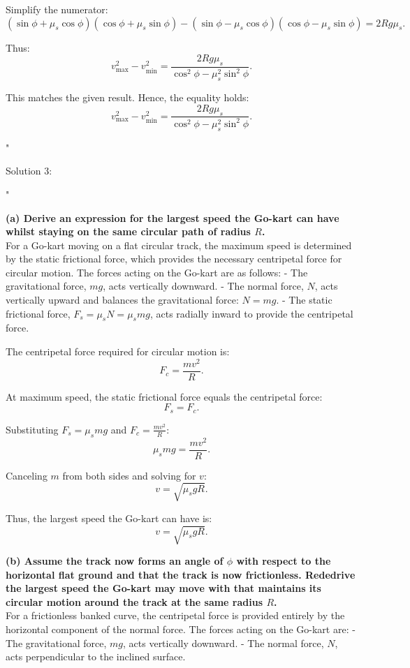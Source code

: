 Simplify the numerator:
\[
(\sin\phi + \mu_s \cos\phi)(\cos\phi + \mu_s \sin\phi) - (\sin\phi - \mu_s \cos\phi)(\cos\phi - \mu_s \sin\phi) = 2Rg\mu_s.
\]

Thus:
\[
v_{\text{max}}^2 - v_{\text{min}}^2 = \frac{2Rg\mu_s}{\cos^2\phi - \mu_s^2 \sin^2\phi}.
\]

This matches the given result. Hence, the equality holds:
\[
\boxed{v_{\text{max}}^2 - v_{\text{min}}^2 = \frac{2Rg\mu_s}{\cos^2\phi - \mu_s^2 \sin^2\phi}}.
\]

"

Solution 3:

"

\textbf{(a) Derive an expression for the largest speed the Go-kart can have whilst staying on the same circular path of radius $R$.} \\

For a Go-kart moving on a flat circular track, the maximum speed is determined by the static frictional force, which provides the necessary centripetal force for circular motion. The forces acting on the Go-kart are as follows:
- The gravitational force, $mg$, acts vertically downward.
- The normal force, $N$, acts vertically upward and balances the gravitational force: $N = mg$.
- The static frictional force, $F_s = \mu_s N = \mu_s mg$, acts radially inward to provide the centripetal force.

The centripetal force required for circular motion is:
\[
F_c = \frac{mv^2}{R}.
\]

At maximum speed, the static frictional force equals the centripetal force:
\[
F_s = F_c.
\]

Substituting $F_s = \mu_s mg$ and $F_c = \frac{mv^2}{R}$:
\[
\mu_s mg = \frac{mv^2}{R}.
\]

Canceling $m$ from both sides and solving for $v$:
\[
v = \sqrt{\mu_s g R}.
\]

Thus, the largest speed the Go-kart can have is:
\[
\boxed{v = \sqrt{\mu_s g R}}.
\]

\textbf{(b) Assume the track now forms an angle of $\phi$ with respect to the horizontal flat ground and that the track is now frictionless. Rededrive the largest speed the Go-kart may move with that maintains its circular motion around the track at the same radius $R$.} \\

For a frictionless banked curve, the centripetal force is provided entirely by the horizontal component of the normal force. The forces acting on the Go-kart are:
- The gravitational force, $mg$, acts vertically downward.
- The normal force, $N$, acts perpendicular to the inclined surface.

